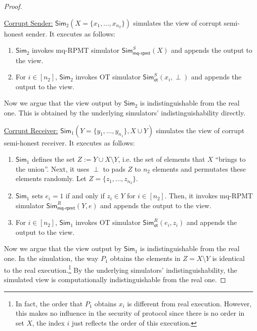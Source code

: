 \documentclass[a4paper,10pt]{article}
\begin{document}
\begin{proof}
\begin{trivlist}
\item \underline{Corrupt Sender:} $\mathsf{Sim}_2(X=\{x_1,\dots,x_{n_2}\})$ 
    simulates the view of corrupt semi-honest sender. It executes as follows:
\begin{enumerate}
\item $\mathsf{Sim}_2$ invokes mq-RPMT simulator $\mathsf{Sim}_\mathsf{mq\text{-}rpmt}^S(X)$ 
    and appends the output to the view.

\item For $i\in [n_2]$, $\mathsf{Sim}_{2}$ invokes OT simulator $\mathsf{Sim}_\mathsf{ot}^S(x_i,\perp)$ 
    and appends the output to the view.
\end{enumerate}
Now we argue that the view output by $\mathsf{Sim}_{2}$ is indistinguishable from the real one. 
This is obtained by the underlying simulators' indistinguishability directly.

\item \underline{Corrupt Receiver:} $\mathsf{Sim}_1(Y=\{y_1,\dots,y_{n_{1}}\}, X \cup Y)$ 
    simulates the view of corrupt semi-honest receiver. It executes as follows:
\begin{enumerate}
\item $\mathsf{Sim}_1$ defines the set $Z := Y\cup X\setminus Y$, 
    i.e. the set of elements that $X$ ``brings to the union''. 
    Next, it uses $\perp$ to pads $Z$ to $n_{2}$ elements and permutates these elements randomly. 
    Let $Z=\{z_1,\dots,z_{n_2}\}$. 

\item $\mathsf{Sim}_1$ sets $e_i = 1$ if and only if $z_i\in Y$ for $i\in [n_2]$. 
    Then, it invokes mq-RPMT simulator $\mathsf{Sim}_\mathsf{mq\text{-}rpmt}^R(Y,e)$ and appends the output to the view.

\item For $i\in [n_2]$, $\mathsf{Sim}_1$ invokes OT simulator 
    $\mathsf{Sim}_\mathsf{ot}^R(e_i,z_i)$ and appends the output to the view.
\end{enumerate}
\end{trivlist}
Now we argue that the view output by $\mathsf{Sim}_{1}$ is indistinguishable from the real one. In the simulation, the way $P_1$ obtains the elements in $Z= X\setminus Y$ is identical to the real execution.\footnote{In fact, the order that $P_1$ obtains $x_i$ is different from real execution. However, this makes no influence in the security of protocol since there is no order in set $X$, the index $i$ just reflects the order of this execution.} By the underlying simulators' indistinguishability, the simulated view is computationally indistinguishable from the real one. 

\end{proof}
\end{document}

